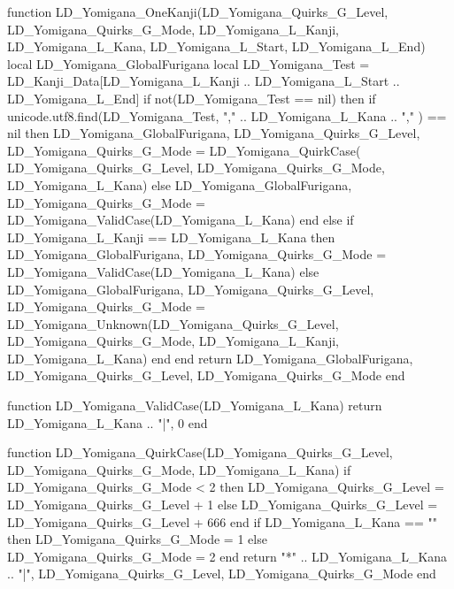 {	function LD_Yomigana_OneKanji(LD_Yomigana_Quirks_G_Level, LD_Yomigana_Quirks_G_Mode, LD_Yomigana_L_Kanji, LD_Yomigana_L_Kana, LD_Yomigana_L_Start, LD_Yomigana_L_End)
		local LD_Yomigana_GlobalFurigana
		local LD_Yomigana_Test = LD_Kanji_Data[LD_Yomigana_L_Kanji .. LD_Yomigana_L_Start .. LD_Yomigana_L_End] 
		if not(LD_Yomigana_Test == nil) then
			if unicode.utf8.find(LD_Yomigana_Test, "," .. LD_Yomigana_L_Kana .. "," ) == nil then
				LD_Yomigana_GlobalFurigana, LD_Yomigana_Quirks_G_Level, LD_Yomigana_Quirks_G_Mode = LD_Yomigana_QuirkCase( LD_Yomigana_Quirks_G_Level, LD_Yomigana_Quirks_G_Mode, LD_Yomigana_L_Kana) 
			else
				LD_Yomigana_GlobalFurigana, LD_Yomigana_Quirks_G_Mode = LD_Yomigana_ValidCase(LD_Yomigana_L_Kana)
			end
		else
			if LD_Yomigana_L_Kanji == LD_Yomigana_L_Kana then 
				LD_Yomigana_GlobalFurigana, LD_Yomigana_Quirks_G_Mode = LD_Yomigana_ValidCase(LD_Yomigana_L_Kana)
			else
				LD_Yomigana_GlobalFurigana, LD_Yomigana_Quirks_G_Level, LD_Yomigana_Quirks_G_Mode = LD_Yomigana_Unknown(LD_Yomigana_Quirks_G_Level, LD_Yomigana_Quirks_G_Mode, LD_Yomigana_L_Kanji, LD_Yomigana_L_Kana)
			end
		end
		return LD_Yomigana_GlobalFurigana, LD_Yomigana_Quirks_G_Level, LD_Yomigana_Quirks_G_Mode
	end		
			
	function LD_Yomigana_ValidCase(LD_Yomigana_L_Kana)
		return LD_Yomigana_L_Kana .. "|", 0
	end
		
	function LD_Yomigana_QuirkCase(LD_Yomigana_Quirks_G_Level, LD_Yomigana_Quirks_G_Mode, LD_Yomigana_L_Kana)
		if LD_Yomigana_Quirks_G_Mode < 2 then
			LD_Yomigana_Quirks_G_Level = LD_Yomigana_Quirks_G_Level + 1
		else
			LD_Yomigana_Quirks_G_Level = LD_Yomigana_Quirks_G_Level + 666
		end
		if LD_Yomigana_L_Kana == "" then
			LD_Yomigana_Quirks_G_Mode = 1 
		else
			LD_Yomigana_Quirks_G_Mode = 2 
		end
		return "*" .. LD_Yomigana_L_Kana .. "|", LD_Yomigana_Quirks_G_Level, LD_Yomigana_Quirks_G_Mode
	end
	
}
